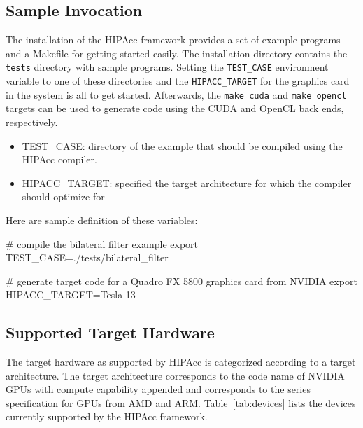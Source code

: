 \subsection{Sample Invocation}
The installation of the \ac{HIPAcc} framework provides a set of example programs and a Makefile for getting started easily.
The installation directory contains the \verb|tests| directory with sample programs.
Setting the {\tt TEST\_CASE} environment variable to one of these directories and the {\tt HIPACC\_TARGET} for the graphics card in the system is all to get started.
Afterwards, the \verb|make cuda| and \verb|make opencl| targets can be used to generate code using the CUDA and OpenCL back ends, respectively.

\begin{itemize}
    \item TEST\_CASE: directory of the example that should be compiled using the
    \ac{HIPAcc} compiler.
    \item HIPACC\_TARGET: specified the target architecture for which the compiler should optimize for
\end{itemize}

Here are sample definition of these variables:
\begin{code}
# compile the bilateral filter example
export TEST_CASE=./tests/bilateral_filter

# generate target code for a Quadro FX 5800 graphics card from NVIDIA
export HIPACC_TARGET=Tesla-13
\end{code}

\subsection{Supported Target Hardware}
The target hardware as supported by \ac{HIPAcc} is categorized according to a
target architecture. The target architecture corresponds to the code name of
NVIDIA GPUs with compute capability appended and corresponds to the series
specification for GPUs from AMD and ARM. Table~\ref{tab:devices} lists the devices
currently supported by the \ac{HIPAcc} framework.


